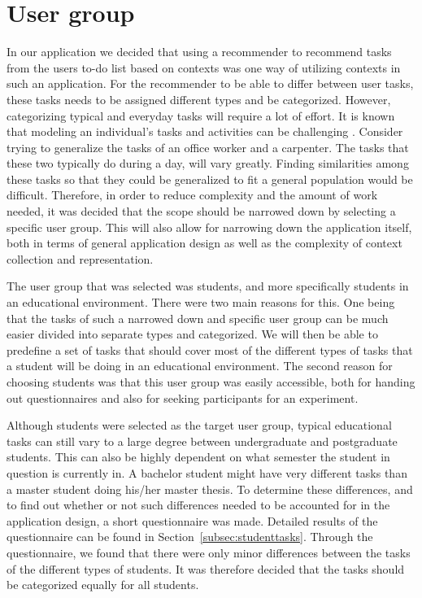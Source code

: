 \section{User group}
In our application we decided that using a recommender to recommend tasks from the users to-do list based on contexts was one way of utilizing contexts in such an application. For the recommender to be able to differ between user tasks, these tasks needs to be assigned different types and be categorized. However, categorizing typical and everyday tasks will require a lot of effort. It is known that modeling an individual's tasks and activities can be challenging \cite{refanidis2010constraint}. Consider trying to generalize the tasks of an office worker and a carpenter. The tasks that these two typically do during a day, will vary greatly. Finding similarities among these tasks so that they could be generalized to fit a general population would be difficult. Therefore, in order to reduce complexity and the amount of work needed, it was decided that the scope should be narrowed down by selecting a specific user group. This will also allow for narrowing down the application itself, both in terms of general application design as well as the complexity of context collection and representation.

The user group that was selected was students, and more specifically students in an educational environment. There were two main reasons for this. One being that the tasks of such a narrowed down and specific user group can be much easier divided into separate types and categorized. We will then be able to predefine a set of tasks that should cover most of the different types of tasks that a student will be doing in an educational environment. The second reason for choosing students was that this user group was easily accessible, both for handing out questionnaires and also for seeking participants for an experiment.

Although students were selected as the target user group, typical educational tasks can still vary to a large degree between undergraduate and postgraduate students. This can also be highly dependent on what semester the student in question is currently in. A bachelor student might have very different tasks than a master student doing his/her master thesis. To determine these differences, and to find out whether or not such differences needed to be accounted for in the application design, a short questionnaire was made. Detailed results of the questionnaire can be found in Section~\ref{subsec:studenttasks}. Through the questionnaire, we found that there were only minor differences between the tasks of the different types of students. It was therefore decided that the tasks should be categorized equally for all students.

